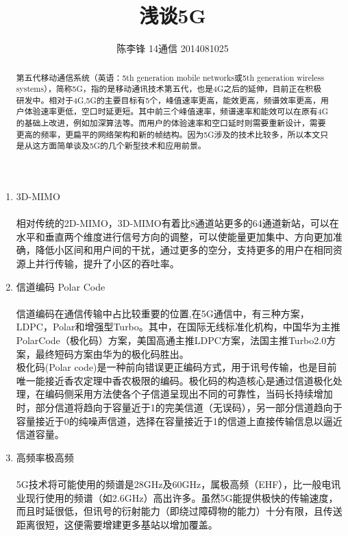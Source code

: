 \documentclass[a4paper]{ctexart}
\title{\centering \LARGE{浅谈5G}\\%
} %
\author{\textsc {陈李锋 14通信 2014081025 } %
} %
\begin{document}
\maketitle %

\begin{abstract}
第五代移动通信系统（英语：5th generation mobile networks或5th generation wireless systems），简称5G，指的是移动通讯技术第五代，也是4G之后的延伸，目前正在积极研发中。相对于4G,5G的主要目标有5个，峰值速率更高，能效更高，频谱效率更高，用户体验速率更低，空口时延更短。其中前三个峰值速率，频谱速率和能效可以在原有4G的基础上改进，例如加深算法等。而用户的体验速率和空口延时则需要重新设计，需要更高的频率，更扁平的网络架构和新的帧结构。因为5G涉及的技术比较多，所以本文只是从这方面简单谈及5G的几个新型技术和应用前景。
\end{abstract}

\subsubsection*{}
\begin{enumerate}
\item 3D-MIMO
\paragraph{} 
\small 相对传统的2D-MIMO，3D-MIMO有着比8通道站更多的64通道新站，可以在水平和垂直两个维度进行信号方向的调整，可以使能量更加集中、方向更加准确，降低小区间和用户间的干扰，通过更多的空分，支持更多的用户在相同资源上并行传输，提升了小区的吞吐率。
\item 信道编码 Polar Code
\paragraph{}
\small 信道编码在通信传输中占比较重要的位置,在5G通信中，有三种方案，LDPC，Polar和增强型Turbo。其中，在国际无线标准化机构，中国华为主推PolarCode（极化码）方案，美国高通主推LDPC方案，法国主推Turbo2.0方案，最终短码方案由华为的极化码胜出。\\
极化码(Polar code)是一种前向错误更正编码方式，用于讯号传输，也是目前唯一能接近香农定理中香农极限的编码。极化码的构造核心是通过信道极化处理，在编码侧采用方法使各个子信道呈现出不同的可靠性，当码长持续增加时，部分信道将趋向于容量近于1的完美信道（无误码），另一部分信道趋向于容量接近于0的纯噪声信道，选择在容量接近于1的信道上直接传输信息以逼近信道容量。
\item 高频率极高频
\paragraph{}
\small 5G技术将可能使用的频谱是28GHz及60GHz，属极高频（EHF），比一般电讯业现行使用的频谱（如2.6GHz）高出许多。虽然5G能提供极快的传输速度，而且时延很低，但讯号的衍射能力（即绕过障碍物的能力）十分有限，且传送距离很短，这便需要增建更多基站以增加覆盖。
\end{enumerate}
\end{document}

